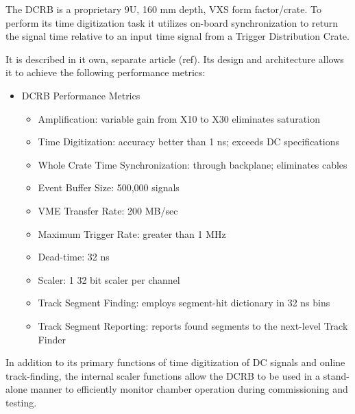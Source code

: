 The DCRB is a proprietary 9U, 160 mm depth, VXS form factor/crate.
To perform its time digitization task it utilizes on-board synchronization to
return the signal time relative to an input time signal from  a Trigger Distribution
Crate.

It is described in it own, separate article (ref).  Its design and architecture
allows it to achieve the following performance metrics:
\begin{itemize}
\item DCRB Performance Metrics
\begin{itemize}
\item Amplification: variable gain from X10 to X30 eliminates saturation
\item Time Digitization: accuracy better than 1 ns; exceeds DC specifications
\item Whole Crate Time Synchronization: through backplane; eliminates cables
\item Event Buffer Size: 500,000 signals
\item VME Transfer Rate: 200 MB/sec
\item Maximum Trigger Rate: greater than 1 MHz
\item Dead-time: 32 ns
\item Scaler: 1 32 bit scaler per channel
\item Track Segment Finding: employs segment-hit dictionary in 32 ns bins
\item Track Segment Reporting: reports found segments to the next-level Track Finder
\end{itemize}
\end{itemize}

In addition to its primary functions of time digitization of DC signals and online
track-finding, the internal scaler functions allow the DCRB to be used in 
a stand-alone manner to efficiently monitor chamber operation during commissioning
and testing.

